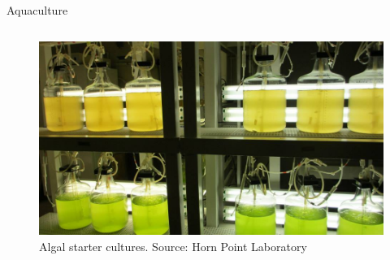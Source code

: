 \documentclass[8pt]{beamer}\usepackage[]{graphicx}\usepackage[]{color}
\begin{document}
\begin{frame}{Aquaculture}
\begin{columns}
                        \begin{figure}
                                \includegraphics[width=1\textwidth]{./figure/HPL_Experiment_underway.jpg}
                                \caption{Algal starter cultures. Source: Horn Point Laboratory}
                        \end{figure}
        \end{columns}
\end{frame}
\end{document}
